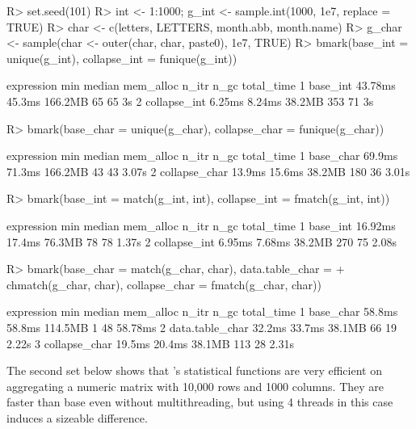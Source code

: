 \documentclass[nojss]{jss} %
\begin{document}
\begin{Schunk}
\begin{Sinput}
R> set.seed(101)
R> int <- 1:1000; g_int <- sample.int(1000, 1e7, replace = TRUE)
R> char <- c(letters, LETTERS, month.abb, month.name)
R> g_char <- sample(char <- outer(char, char, paste0), 1e7, TRUE)
R> bmark(base_int = unique(g_int), collapse_int = funique(g_int))
\end{Sinput}
\begin{Soutput}
    expression     min  median mem_alloc n_itr n_gc total_time
1     base_int 43.78ms  45.3ms   166.2MB    65   65         3s
2 collapse_int  6.25ms  8.24ms    38.2MB   353   71         3s
\end{Soutput}
\begin{Sinput}
R> bmark(base_char = unique(g_char), collapse_char = funique(g_char))
\end{Sinput}
\begin{Soutput}
     expression    min median mem_alloc n_itr n_gc total_time
1     base_char 69.9ms 71.3ms   166.2MB    43   43      3.07s
2 collapse_char 13.9ms 15.6ms    38.2MB   180   36      3.01s
\end{Soutput}
\begin{Sinput}
R> bmark(base_int = match(g_int, int), collapse_int = fmatch(g_int, int))
\end{Sinput}
\begin{Soutput}
    expression     min  median mem_alloc n_itr n_gc total_time
1     base_int 16.92ms  17.4ms    76.3MB    78   78      1.37s
2 collapse_int  6.95ms  7.68ms    38.2MB   270   75      2.08s
\end{Soutput}
\begin{Sinput}
R> bmark(base_char = match(g_char, char), data.table_char =
+        chmatch(g_char, char), collapse_char = fmatch(g_char, char))
\end{Sinput}
\begin{Soutput}
       expression    min median mem_alloc n_itr n_gc total_time
1       base_char 58.8ms 58.8ms   114.5MB     1   48    58.78ms
2 data.table_char 32.2ms 33.7ms    38.1MB    66   19      2.22s
3   collapse_char 19.5ms 20.4ms    38.1MB   113   28      2.31s
\end{Soutput}
\end{Schunk}
%
The second set below shows that 's statistical functions are very efficient on aggregating a numeric matrix with 10,000 rows and 1000 columns. They are faster than base  even without multithreading, but using 4 threads in this case induces a sizeable difference.
\end{document}
